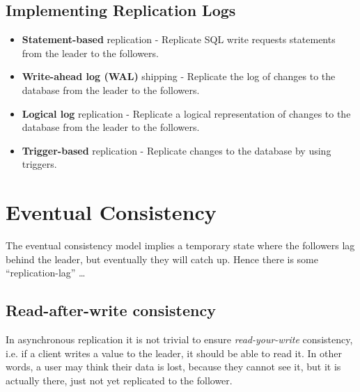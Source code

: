 \subsection{Implementing Replication Logs}
\begin{itemize}
   \item \textbf{Statement-based} replication - Replicate SQL write requests statements from the leader to the followers.
   \item \textbf{Write-ahead log (WAL)} shipping - Replicate the log of changes to the database from the leader to the followers.
   \item \textbf{Logical log} replication - Replicate a logical representation of changes to the database from the leader to the followers.
   \item \textbf{Trigger-based} replication - Replicate changes to the database by using triggers.
\end{itemize}


\section{Eventual Consistency}
The eventual consistency model implies a temporary state where the followers lag behind the leader, but eventually they will catch up. 
Hence there is some ``replication-lag'' \dots

\subsection{Read-after-write consistency}
In asynchronous replication it is not trivial to ensure \textit{read-your-write} consistency, i.e. if a client writes a value to the leader, it should be able to read it.
In other words, a user may think their data is lost, because they cannot see it, but it is actually there, just not yet replicated to the follower.

